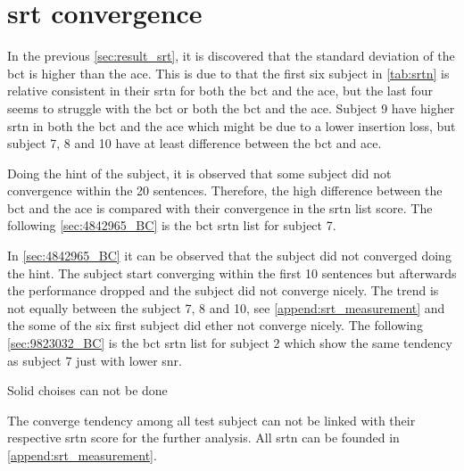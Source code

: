 \section{\gls{srt} convergence}
In the previous \autoref{sec:result_srt}, it is discovered that the standard deviation of the \gls{bct} is  higher than the \gls{ace}. This is due to that the first six subject in \autoref{tab:srtn} is relative consistent in their \gls{srtn} for both the \gls{bct} and the \gls{ace}, but the last four seems to struggle with the \gls{bct} or both the \gls{bct} and the \gls{ace}. Subject 9 have higher \gls{srtn} in both the \gls{bct} and the \gls{ace} which might be due to a lower insertion loss, but subject 7, 8 and 10 have at least  difference between the \gls{bct} and \gls{ace}. 


Doing the \gls{hint} of the subject, it is observed that some subject did not convergence within the 20 sentences. Therefore, the high difference between the \gls{bct} and the \gls{ace} is compared with their convergence in the \gls{srtn} list score. The following \autoref{sec:4842965_BC} is the \gls{bct} \gls{srtn} list for subject 7.



In \autoref{sec:4842965_BC} it can be observed that the subject did not converged doing the \gls{hint}. The subject start converging within the first 10 sentences but afterwards the performance dropped and the subject did not converge nicely. The trend is not equally between the subject 7, 8 and 10, see \autoref{append:srt_measurement} and the some of the six first subject did ether not converge nicely. The following \autoref{sec:9823032_BC} is the \gls{bct} \gls{srtn} list for subject 2 which show the same tendency as subject 7 just with lower \gls{snr}.





Solid choises can not be done 

The converge tendency among all test subject can not be linked with their respective \gls{srtn} score for the further analysis. All \gls{srtn} can be founded in \autoref{append:srt_measurement}.